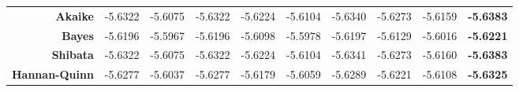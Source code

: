 \begin{landscape}
\begin{table}[]
\begin{tabular}{rlllllllll}
\multicolumn{1}{r|}{\textbf{Akaike}} & \multicolumn{1}{l|}{-5.6322} & \multicolumn{1}{l|}{-5.6075} & \multicolumn{1}{l|}{-5.6322} & \multicolumn{1}{l|}{-5.6224} & \multicolumn{1}{l|}{-5.6104} & \multicolumn{1}{l|}{-5.6340} & \multicolumn{1}{l|}{-5.6273} & \multicolumn{1}{l|}{-5.6159} & \textbf{-5.6383} \\
\multicolumn{1}{r|}{\textbf{Bayes}} & \multicolumn{1}{l|}{-5.6196} & \multicolumn{1}{l|}{-5.5967} & \multicolumn{1}{l|}{-5.6196} & \multicolumn{1}{l|}{-5.6098} & \multicolumn{1}{l|}{-5.5978} & \multicolumn{1}{l|}{-5.6197} & \multicolumn{1}{l|}{-5.6129} & \multicolumn{1}{l|}{-5.6016} & \textbf{-5.6221} \\
\multicolumn{1}{r|}{\textbf{Shibata}} & \multicolumn{1}{l|}{-5.6322} & \multicolumn{1}{l|}{-5.6075} & \multicolumn{1}{l|}{-5.6322} & \multicolumn{1}{l|}{-5.6224} & \multicolumn{1}{l|}{-5.6104} & \multicolumn{1}{l|}{-5.6341} & \multicolumn{1}{l|}{-5.6273} & \multicolumn{1}{l|}{-5.6160} & \textbf{-5.6383} \\
\multicolumn{1}{r|}{\textbf{Hannan-Quinn}} & \multicolumn{1}{l|}{-5.6277} & \multicolumn{1}{l|}{-5.6037} & \multicolumn{1}{l|}{-5.6277} & \multicolumn{1}{l|}{-5.6179} & \multicolumn{1}{l|}{-5.6059} & \multicolumn{1}{l|}{-5.6289} & \multicolumn{1}{l|}{-5.6221} & \multicolumn{1}{l|}{-5.6108} & \textbf{-5.6325} \\ \hline
\end{tabular}
\end{table}
\end{landscape}